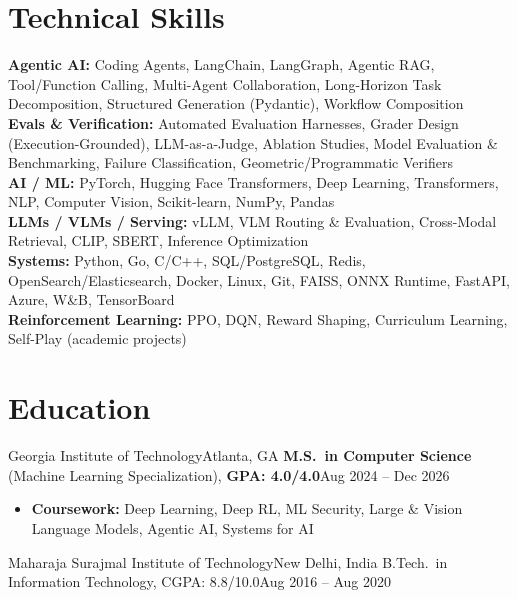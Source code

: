 \documentclass[letterpaper,11pt]{article}
\begin{document}
\section{Technical Skills}
\footnotesize
\textbf{Agentic AI:} Coding Agents, LangChain, LangGraph,
  Agentic RAG, Tool/Function Calling, Multi-Agent Collaboration, Long-Horizon Task Decomposition,
  Structured Generation (Pydantic), Workflow Composition \\[1pt]
\textbf{Evals \& Verification:} Automated Evaluation Harnesses, Grader Design (Execution-Grounded),
  LLM-as-a-Judge, Ablation Studies, Model Evaluation \& Benchmarking, Failure Classification,
  Geometric/Programmatic Verifiers \\[1pt]
\textbf{AI / ML:} PyTorch, Hugging Face Transformers, Deep Learning, Transformers, NLP, Computer Vision,
  Scikit-learn, NumPy, Pandas \\[1pt]
\textbf{LLMs / VLMs / Serving:} vLLM, VLM Routing \& Evaluation, Cross-Modal Retrieval, CLIP, SBERT, Inference Optimization \\[1pt]
\textbf{Systems:} Python, Go, C/C++, SQL/PostgreSQL, Redis, OpenSearch/Elasticsearch, Docker, Linux, Git,
  FAISS, ONNX Runtime, FastAPI, Azure, W\&B, TensorBoard \\[1pt]
\textbf{Reinforcement Learning:} PPO, DQN, Reward Shaping, Curriculum Learning, Self-Play (academic projects)

\section{Education}
\resumeSubHeadingListStart
\resumeSubheading
{Georgia Institute of Technology}{Atlanta, GA}
{\textbf{M.S.\ in Computer Science} (Machine Learning Specialization), \textbf{GPA: 4.0/4.0}}{Aug 2024 -- Dec 2026}
\vspace{2pt}
\begin{itemize}[leftmargin=0.20in, topsep=2pt, itemsep=0pt]
  \item\footnotesize{\textbf{Coursework:} Deep Learning, Deep RL, ML Security, Large \& Vision Language Models, Agentic AI, Systems for AI}
\end{itemize}
\vspace{-2pt}
\resumeEducationCompact
{Maharaja Surajmal Institute of Technology}{New Delhi, India}
{B.Tech.\ in Information Technology, CGPA: 8.8/10.0}{Aug 2016 -- Aug 2020}
\resumeSubHeadingListEnd
\end{document}
